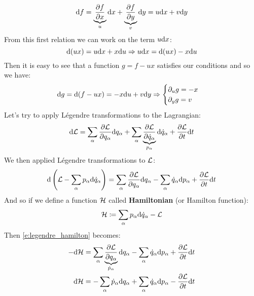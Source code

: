 \begin{equation}
    \mathrm{d}f = \underbrace{\dfrac{\partial f}{\partial x}}_u \mathrm{d}x + \underbrace{\dfrac{\partial f}{\partial y}}_v \mathrm{d}y = u\mathrm{d}x + v\mathrm{d}y
\end{equation}
From this first relation we can work on the term $u\mathrm{d}x$:
\begin{equation}
    \mathrm{d}(ux) = u\mathrm{d}x + x\mathrm{d}u \Rightarrow u\mathrm{d}x = \mathrm{d}(ux) - x\mathrm{d}u
\end{equation}
Then it is easy to see that a function $g = f-ux$ satisfies our conditions and so we have:
\begin{equation}
    \mathrm{d}g = \mathrm{d}(f-ux) = - x\mathrm{d}u + v\mathrm{d}y \Rightarrow \begin{cases}
        \partial_{u} g = -x\\
        \partial_{y} g = v
    \end{cases}
\end{equation}
Let's try to apply Légendre transformations to the Lagrangian:
\begin{equation}
    \mathrm{d}\mathcal{L} = \displaystyle\sum_{\alpha} \dfrac{\partial \mathcal{L}}{\partial q_{\alpha}}\mathrm{d}q_{\alpha} + \displaystyle\sum_{\alpha} \underbrace{\dfrac{\partial \mathcal{L}}{\partial \dot{q}_{\alpha}}}_{p_{\alpha}}\mathrm{d}\dot{q}_{\alpha} + \dfrac{\partial \mathcal{L}}{\partial t}\mathrm{d}t
\end{equation}
We then applied Légendre transformations to $\mathcal{L}$:
\begin{equation} \label{e:legendre_hamilton}
    \mathrm{d}\left(\mathcal{L} - \displaystyle\sum_{\alpha} p_{\alpha}\mathrm{d}\dot{q}_{\alpha}\right) = \displaystyle\sum_{\alpha} \dfrac{\partial \mathcal{L}}{\partial q_{\alpha}}\mathrm{d}q_{\alpha} - \displaystyle\sum_{\alpha} \dot{q}_{\alpha}\mathrm{d}p_{\alpha} + \dfrac{\partial \mathcal{L}}{\partial t}\mathrm{d}t
\end{equation}
And so if we define a function $\mathcal{H}$ called \textbf{Hamiltonian} (or Hamilton function):
\begin{equation}
    \mathcal{H} \coloneqq \displaystyle\sum_{\alpha} p_{\alpha}\mathrm{d}\dot{q}_{\alpha} -\mathcal{L}
\end{equation}
Then \eqref{e:legendre_hamilton} becomes:
\begin{equation}
    \begin{split}
        -\mathrm{d}\mathcal{H} = \displaystyle\sum_{\alpha} \underbrace{\dfrac{\partial \mathcal{L}}{\partial q_{\alpha}}}_{\dot{p}_{\alpha}}\mathrm{d}q_{\alpha} - \displaystyle\sum_{\alpha} \dot{q}_{\alpha}\mathrm{d}p_{\alpha} + \dfrac{\partial \mathcal{L}}{\partial t}\mathrm{d}t\\
        \mathrm{d}\mathcal{H} = -\displaystyle\sum_{\alpha} \dot{p}_{\alpha}\mathrm{d}q_{\alpha} + \displaystyle\sum_{\alpha} \dot{q}_{\alpha}\mathrm{d}p_{\alpha} - \dfrac{\partial \mathcal{L}}{\partial t}\mathrm{d}t\\
    \end{split}
\end{equation}
